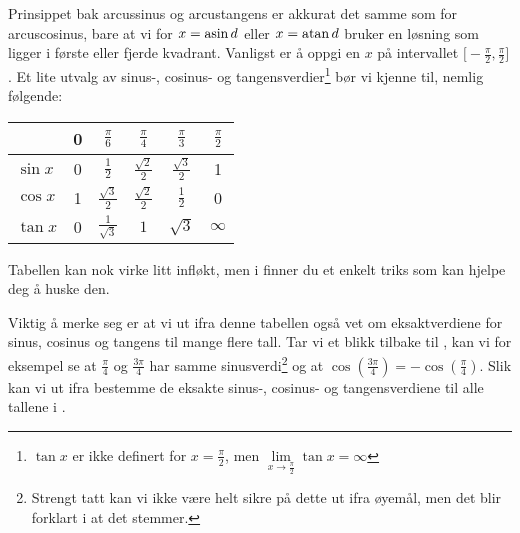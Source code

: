 Prinsippet bak arcussinus og arcustangens er akkurat det samme som for arcuscosinus, bare at vi for $ {x=\operatorname{asin} d}$ eller $ {x=\operatorname{atan} d }$ bruker en løsning som ligger i første eller fjerde kvadrant. Vanligst er å oppgi en $ x $ på intervallet $ {\Big[-\frac{\pi}{2}, \frac{\pi}{2}\Big]} $.
\newpage
\arcus
\arcuse
{}
Et lite utvalg av sinus-, cosinus- og tangensverdier\footnote{$ \tan x $ er ikke definert for $ {x=\frac{\pi}{2}} $, men $ {\lim\limits_{x\to\frac{\pi}{2} }\tan x =\infty} $} bør vi kjenne til, nemlig følgende:

{\centering		\renewcommand{\arraystretch}{1.5}	
		\begin{tabular}{l|c|c|c|c|c}
			& 0&$\frac{\pi}{6}$ & $\frac{\pi}{4}$ &$\frac{\pi}{3}$ & $\frac{\pi}{2}$    \\
			\hline
			$\sin x$ & 0 &$\frac{1}{2}$ & $\frac{\sqrt{2}}{2}$ & $\frac{\sqrt{3}}{2}$ & 1 \\
			$\cos x$ & 1 & $\frac{\sqrt{3}}{2}$ & $\frac{\sqrt{2}}{2}$ & $\frac{1}{2}$ & 0 \\
			$\tan x$ & 0 &$\frac{1}{\sqrt{3}}$ & $1$ & $\sqrt{3}$ & $ \infty  $
		\end{tabular}
}\vsk

Tabellen kan nok virke litt infløkt, men i  finner du et enkelt triks som kan hjelpe deg å huske den.\vsk

Viktig å merke seg er at vi ut ifra denne tabellen også vet om eksaktverdiene for sinus, cosinus og tangens til mange flere tall. Tar vi et blikk tilbake til , kan vi for eksempel se at $ \frac{\pi}{4} $ og $ \frac{3\pi}{4} $ har samme sinusverdi\footnote{Strengt tatt kan vi ikke være helt sikre på dette ut ifra øyemål, men det blir forklart i  at det stemmer.} og at $ {\cos \left(\frac{3\pi}{4}\right)=-\cos \left(\frac{\pi}{4}\right) }$. Slik kan vi ut ifra  bestemme de eksakte sinus-, cosinus- og tangensverdiene til alle tallene i .

